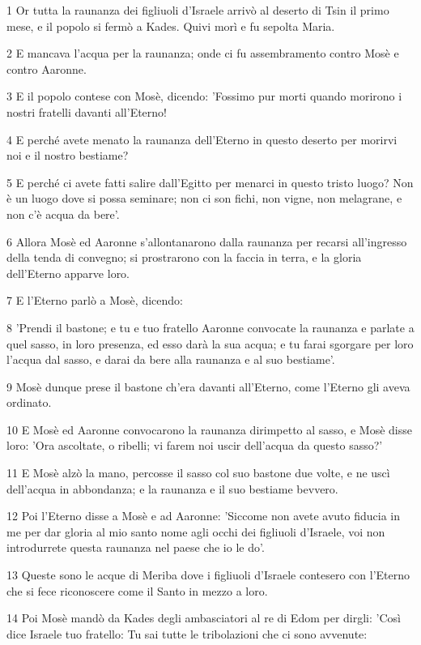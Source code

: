 \par 1 Or tutta la raunanza dei figliuoli d'Israele arrivò al deserto di Tsin il primo mese, e il popolo si fermò a Kades. Quivi morì e fu sepolta Maria.
\par 2 E mancava l'acqua per la raunanza; onde ci fu assembramento contro Mosè e contro Aaronne.
\par 3 E il popolo contese con Mosè, dicendo: 'Fossimo pur morti quando morirono i nostri fratelli davanti all'Eterno!
\par 4 E perché avete menato la raunanza dell'Eterno in questo deserto per morirvi noi e il nostro bestiame?
\par 5 E perché ci avete fatti salire dall'Egitto per menarci in questo tristo luogo? Non è un luogo dove si possa seminare; non ci son fichi, non vigne, non melagrane, e non c'è acqua da bere'.
\par 6 Allora Mosè ed Aaronne s'allontanarono dalla raunanza per recarsi all'ingresso della tenda di convegno; si prostrarono con la faccia in terra, e la gloria dell'Eterno apparve loro.
\par 7 E l'Eterno parlò a Mosè, dicendo:
\par 8 'Prendi il bastone; e tu e tuo fratello Aaronne convocate la raunanza e parlate a quel sasso, in loro presenza, ed esso darà la sua acqua; e tu farai sgorgare per loro l'acqua dal sasso, e darai da bere alla raunanza e al suo bestiame'.
\par 9 Mosè dunque prese il bastone ch'era davanti all'Eterno, come l'Eterno gli aveva ordinato.
\par 10 E Mosè ed Aaronne convocarono la raunanza dirimpetto al sasso, e Mosè disse loro: 'Ora ascoltate, o ribelli; vi farem noi uscir dell'acqua da questo sasso?'
\par 11 E Mosè alzò la mano, percosse il sasso col suo bastone due volte, e ne uscì dell'acqua in abbondanza; e la raunanza e il suo bestiame bevvero.
\par 12 Poi l'Eterno disse a Mosè e ad Aaronne: 'Siccome non avete avuto fiducia in me per dar gloria al mio santo nome agli occhi dei figliuoli d'Israele, voi non introdurrete questa raunanza nel paese che io le do'.
\par 13 Queste sono le acque di Meriba dove i figliuoli d'Israele contesero con l'Eterno che si fece riconoscere come il Santo in mezzo a loro.
\par 14 Poi Mosè mandò da Kades degli ambasciatori al re di Edom per dirgli: 'Così dice Israele tuo fratello: Tu sai tutte le tribolazioni che ci sono avvenute:
